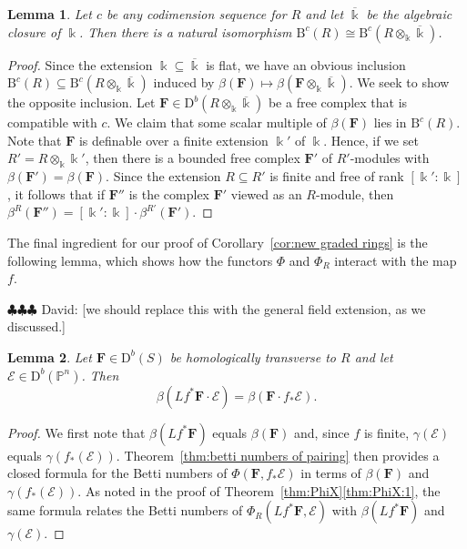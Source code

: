 \documentclass[12pt]{amsart}
\newtheorem{lemma}{Lemma}[section]
\theoremstyle{definition}
\theoremstyle{remark}
\newcommand{\kk}{\Bbbk}
\newcommand{\PP}{\mathbb{P}}
\newcommand{\cc}{c}
\newcommand{\cE}{\mathcal{E}}
\newcommand{\FF}{\mathbf{F}}
\newcommand{\DD}{\mathrm{D}}
\newcommand{\BBQ}{\mathrm{B}}
\newcommand{\david}[1]{{\color{red} \sf $\clubsuit\clubsuit\clubsuit$ David: [#1]}}
\begin{document}
\begin{lemma}\label{lem:ground field}
Let $\cc$ be any codimension sequence for $R$ and let $\overline{\kk}$ be the algebraic closure of $\kk$.  Then there is a natural isomorphism $\BBQ^{\cc}(R)\cong\BBQ^{\cc}(R\otimes_{\kk} \overline{\kk})$.
\end{lemma}
\begin{proof}
Since the extension $\kk\subseteq \overline{\kk}$ is flat, we have an obvious inclusion $\BBQ^{\cc}(R)\subseteq\BBQ^{\cc}(R\otimes_{\kk} \overline{\kk})$ induced by $\beta(\FF)\mapsto \beta(\FF\otimes_{\kk} \overline{\kk})$.  We seek to show the opposite inclusion.  Let $\FF\in \DD^b(R\otimes_{\kk}\overline{\kk})$ be a free complex that is compatible with $\cc$.  We claim that some scalar multiple of $\beta(\FF)$ lies in $\BBQ^{\cc}(R)$.  Note that $\FF$ is definable over a finite extension $\kk'$ of $\kk$.  Hence, if we set $R'=R\otimes_{\kk}\kk'$, then there is a bounded free complex $\FF'$ of $R'$-modules with $\beta(\FF')=\beta(\FF)$.  Since the extension $R\subseteq R'$ is finite and free of rank $[\kk':\kk]$, it follows that if $\FF''$ is the complex $\FF'$ viewed as an $R$-module, then $\beta^R(\FF'')=[\kk':\kk]\cdot \beta^{R'}(\FF')$. 
\end{proof}

The final ingredient for our proof of Corollary~\ref{cor:new graded rings} is the following lemma, which shows how the functors $\Phi$ and $\Phi_{R}$ interact with the map $f$.

\david{we should replace this with the general  field extension, as we discussed.}
\begin{lemma}\label{lem:general pairing}
Let $\FF\in \DD^b(S)$ be homologically transverse to $R$ and let $\cE\in \DD^b(\PP^n)$.  Then
\[
\beta(Lf^*\FF\cdot \cE)=\beta(\FF\cdot f_*\cE).
\]
\end{lemma}
\begin{proof}
We first note that $\beta(Lf^*\FF)$ equals $\beta(\FF)$ and, since $f$ is finite, $\gamma(\cE)$ equals $\gamma(f_*(\cE))$.  Theorem~\ref{thm:betti numbers of pairing} then provides a closed formula for the Betti numbers of $\Phi(\FF,f_*\cE)$ in terms of $\beta(\FF)$ and $\gamma(f_*(\cE))$.  As noted in the proof of Theorem~\ref{thm:PhiX}\eqref{thm:PhiX:1}, the same formula relates the Betti numbers of $\Phi_{R}(Lf^*\FF,\cE)$ with  $\beta(Lf^*\FF)$ and $\gamma(\cE)$.
\end{proof}
%
\end{document}
